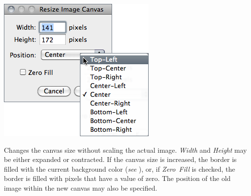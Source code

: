 

\subsubsection[\protect\userinterface{Canvas Size\ldots{}}]{\protect{}\label{sub:Canvas-Size...}\improvement{}}

\begin{minipage}[c][1\totalheight][t]{0.42\columnwidth}%
\includegraphics[scale=0.55]{images/ResizeCanvas}%
\end{minipage}%
\begin{minipage}[c][1\totalheight][t]{0.58\columnwidth}%
Changes the canvas size without scaling the actual
image. \emph{Width} and \emph{Height} may be either expanded or contracted.
If the canvas size is increased, the border is filled with the current
background color (\emph{see} ),
or, if \emph{Zero~Fill} is checked, the border is filled with pixels
that have a value of zero. The position of the old image within the
new canvas may also be specified.


%
\end{minipage}


\subsubsection{\protect{}\label{sub:Line-WidthSlider}}

